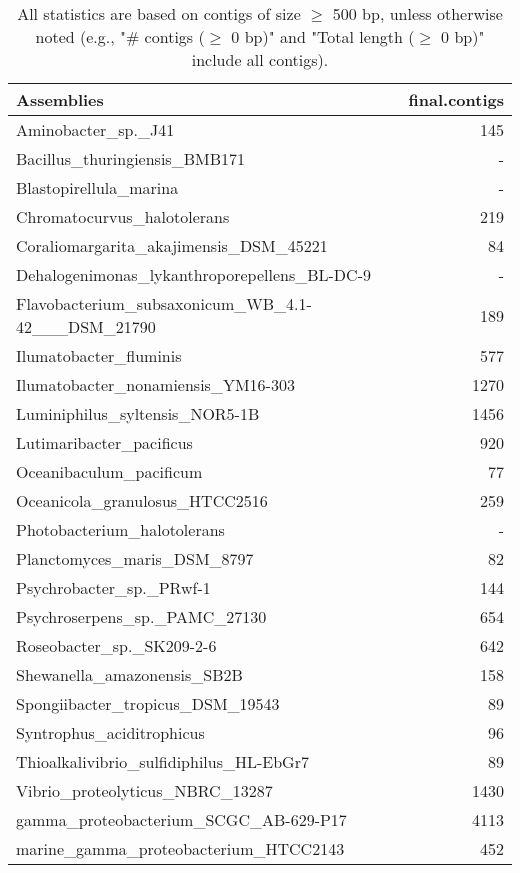 \documentclass[12pt,a4paper]{article}
\begin{document}
\begin{table}[ht]
\begin{center}
\caption{All statistics are based on contigs of size $\geq$ 500 bp, unless otherwise noted (e.g., "\# contigs ($\geq$ 0 bp)" and "Total length ($\geq$ 0 bp)" include all contigs).}
\begin{tabular}{|l*{1}{|r}|}
\hline
Assemblies & final.contigs \\ \hline
Aminobacter\_sp.\_J41 & 145 \\ \hline
Bacillus\_thuringiensis\_BMB171 & - \\ \hline
Blastopirellula\_marina & - \\ \hline
Chromatocurvus\_halotolerans & 219 \\ \hline
Coraliomargarita\_akajimensis\_DSM\_45221 & 84 \\ \hline
Dehalogenimonas\_lykanthroporepellens\_BL-DC-9 & - \\ \hline
Flavobacterium\_subsaxonicum\_WB\_4.1-42\_\_\_DSM\_21790 & 189 \\ \hline
Ilumatobacter\_fluminis & 577 \\ \hline
Ilumatobacter\_nonamiensis\_YM16-303 & 1270 \\ \hline
Luminiphilus\_syltensis\_NOR5-1B & 1456 \\ \hline
Lutimaribacter\_pacificus & 920 \\ \hline
Oceanibaculum\_pacificum & 77 \\ \hline
Oceanicola\_granulosus\_HTCC2516 & 259 \\ \hline
Photobacterium\_halotolerans & - \\ \hline
Planctomyces\_maris\_DSM\_8797 & 82 \\ \hline
Psychrobacter\_sp.\_PRwf-1 & 144 \\ \hline
Psychroserpens\_sp.\_PAMC\_27130 & 654 \\ \hline
Roseobacter\_sp.\_SK209-2-6 & 642 \\ \hline
Shewanella\_amazonensis\_SB2B & 158 \\ \hline
Spongiibacter\_tropicus\_DSM\_19543 & 89 \\ \hline
Syntrophus\_aciditrophicus & 96 \\ \hline
Thioalkalivibrio\_sulfidiphilus\_HL-EbGr7 & 89 \\ \hline
Vibrio\_proteolyticus\_NBRC\_13287 & 1430 \\ \hline
gamma\_proteobacterium\_SCGC\_AB-629-P17 & 4113 \\ \hline
marine\_gamma\_proteobacterium\_HTCC2143 & 452 \\ \hline
\end{tabular}
\end{center}
\end{table}
\end{document}
